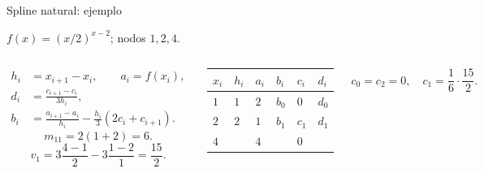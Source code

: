 \documentclass[main.tex]{subfiles}
\begin{document}
\begin{frame}[t]{Spline natural: ejemplo}
\par\noindent\begin{minipage}[t][9mm][t]{\textwidth}\small\strut $f(x)=(x/2)^{x-2}$; nodos $1,2,4$.\end{minipage}\par\nointerlineskip
\begin{columns}[T]\scriptsize\begin{align*}
h_i&=x_{i+1}-x_i,\qquad a_i=f(x_i),\\
d_i&=\frac{c_{i+1}-c_i}{3h_i},\\
b_i&=\frac{a_{i+1}-a_i}{h_i}-\frac{h_i}{3}(2c_i+c_{i+1}).
\end{align*}\scriptsize\[m_{11}=2(1+2)=6.\]\[v_1=3\frac{4-1}{2}-3\frac{1-2}{1}=\frac{15}{2}.\]\begin{minipage}[t]{\textwidth}\begingroup\scriptsize\setlength{\tabcolsep}{2pt}\begin{center}\begin{tabular}{|C{.12\textwidth}|C{.12\textwidth}|C{.12\textwidth}|C{.12\textwidth}|C{.12\textwidth}|C{.12\textwidth}|}\hline
\rule[-2mm]{0pt}{6mm}$x_i$&$h_i$&$a_i$&$b_i$&$c_i$&$d_i$\\\hline
\rule[-2.5mm]{0pt}{7mm}$1$&$1$&$2$&$b_0$&$0$&$d_0$\\\hline
\rule[-2.5mm]{0pt}{7mm}$2$&$2$&$1$&$b_1$&$c_1$&$d_1$\\\hline
\rule[-2.5mm]{0pt}{7mm}$4$&&$4$&&$0$&\\\hline
\end{tabular}\end{center}\endgroup\end{minipage}\par
\scriptsize\[c_0=c_2=0,\quad c_1=\frac16\cdot\frac{15}{2}.\]\end{columns}
\end{frame}
\end{document}
